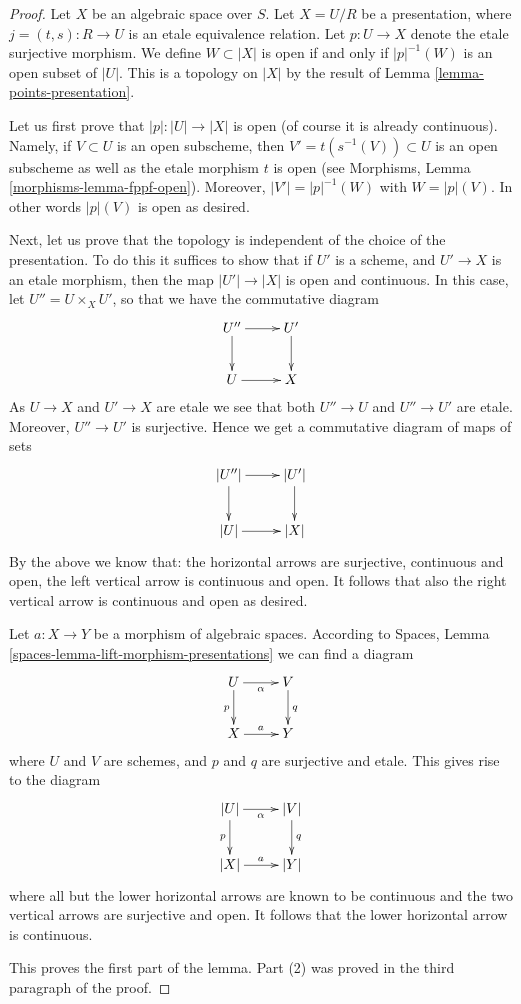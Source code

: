 \begin{proof}
Let $X$ be an algebraic space over $S$. Let $X = U/R$ be a presentation,
where $j = (t, s) : R \to U$ is an etale equivalence relation.
Let $p : U \to X$ denote the etale surjective morphism.
We define $W \subset |X|$ is open if and only if $|p|^{-1}(W)$
is an open subset of $|U|$. This is a topology on $|X|$ by
the result of Lemma \ref{lemma-points-presentation}.

\medskip\noindent
Let us first prove that $|p| : |U| \to |X|$ is open (of course it is
already continuous). Namely, if $V \subset U$ is an open subscheme,
then $V' = t(s^{-1}(V)) \subset U$ is an open subscheme as well
as the etale morphism $t$ is open (see
Morphisms, Lemma \ref{morphisms-lemma-fppf-open}).
Moreover, $|V'| = |p|^{-1}(W)$ with $W = |p|(V)$. In other words
$|p|(V)$ is open as desired.

\medskip\noindent
Next, let us prove that the topology is independent of the choice of
the presentation. To do this it suffices to show that if $U'$ is a scheme,
and $U' \to X$ is an etale morphism, then the map $|U'| \to |X|$
is open and continuous. In this case, let $U'' = U \times_X U'$, so that
we have the commutative diagram
$$
\xymatrix{
U'' \ar[r] \ar[d] & U' \ar[d] \\
U \ar[r] & X
}
$$
As $U \to X$ and $U' \to X$ are etale we see that
both $U'' \to U$ and $U'' \to U'$ are etale. Moreover, $U'' \to U'$
is surjective. Hence
we get a commutative diagram of maps of sets
$$
\xymatrix{
|U''| \ar[r] \ar[d] & |U'| \ar[d] \\
|U| \ar[r] & |X|
}
$$
By the above we know that:
the horizontal arrows are surjective, continuous and open,
the left vertical arrow is continuous and open.
It follows that also the right vertical arrow
is continuous and open as desired.

\medskip\noindent
Let $a : X \to Y$ be a morphism of algebraic spaces. According to
Spaces, Lemma \ref{spaces-lemma-lift-morphism-presentations}
we can find a diagram
$$
\xymatrix{
U \ar[d]_p \ar[r]_\alpha & V \ar[d]^q \\
X \ar[r]^a & Y
}
$$
where $U$ and $V$ are schemes, and $p$ and $q$ are surjective and etale.
This gives rise to the diagram
$$
\xymatrix{
|U| \ar[d]_p \ar[r]_\alpha & |V| \ar[d]^q \\
|X| \ar[r]^a & |Y|
}
$$
where all but the lower horizontal arrows are known to be continuous and
the two vertical arrows are surjective and open. It follows that the
lower horizontal arrow is continuous.

\medskip\noindent
This proves the first part of the lemma. Part (2) was proved in the
third paragraph of the proof.
\end{proof}


